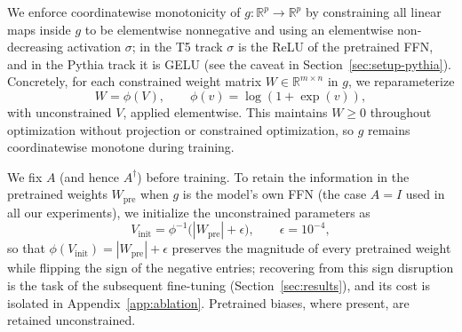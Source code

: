 \documentclass{article}
\theoremstyle{plain}
\theoremstyle{definition}
\newtheorem{definition}[theorem]{Definition}
\theoremstyle{remark}
\begin{document}


We enforce coordinatewise monotonicity of $g:\mathbb{R}^p\to\mathbb{R}^p$ by
constraining all linear maps inside $g$ to be elementwise nonnegative and using
an elementwise non-decreasing activation $\sigma$; in the T5 track $\sigma$ is the
ReLU of the pretrained FFN, and in the Pythia track it is GELU (see the caveat in
Section~\ref{sec:setup-pythia}).
Concretely, for each constrained weight matrix $W \in \mathbb{R}^{m\times n}$ in $g$,
we reparameterize
\[
W = \phi(V), \qquad \phi(v) = \log(1+\exp(v)),
\]
with unconstrained $V$, applied elementwise. This maintains $W \ge 0$ throughout
optimization without projection or constrained optimization, so $g$ remains
coordinatewise monotone during training.

We fix $A$ (and hence $A^\dagger$) before training. To retain the information in
the pretrained weights $W_{\mathrm{pre}}$ when $g$ is the model's own FFN (the case
$A = I$ used in all our experiments), we initialize the unconstrained parameters as
\[
V_{\mathrm{init}} = \phi^{-1}\bigl(|W_{\mathrm{pre}}| + \epsilon\bigr), \qquad \epsilon = 10^{-4},
\]
so that $\phi(V_{\mathrm{init}}) = |W_{\mathrm{pre}}| + \epsilon$ preserves the
magnitude of every pretrained weight while flipping the sign of the negative
entries; recovering from this sign disruption is the task of the subsequent
fine-tuning (Section~\ref{sec:results}), and its cost is isolated in
Appendix~\ref{app:ablation}. Pretrained biases, where present, are retained
unconstrained.
\end{document}
